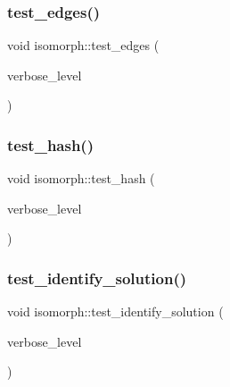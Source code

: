 \mbox{\label{classisomorph_ad23507927d8f7698073475d12b2a85bc}} 
\subsubsection{\texorpdfstring{test\+\_\+edges()}{test\_edges()}}
{\footnotesize\ttfamily void isomorph\+::test\+\_\+edges (\begin{DoxyParamCaption}\item[{\mbox{\hyperlink{galois_8h_a09fddde158a3a20bd2dcadb609de11dc}{I\+NT}}}]{verbose\+\_\+level }\end{DoxyParamCaption})}

\mbox{\label{classisomorph_a53560280664b268a0500d26c801b1e68}} 
\subsubsection{\texorpdfstring{test\+\_\+hash()}{test\_hash()}}
{\footnotesize\ttfamily void isomorph\+::test\+\_\+hash (\begin{DoxyParamCaption}\item[{\mbox{\hyperlink{galois_8h_a09fddde158a3a20bd2dcadb609de11dc}{I\+NT}}}]{verbose\+\_\+level }\end{DoxyParamCaption})}

\mbox{\label{classisomorph_aa2c95f309e3283179e87bbbd83bfdc7d}} 
\subsubsection{\texorpdfstring{test\+\_\+identify\+\_\+solution()}{test\_identify\_solution()}}
{\footnotesize\ttfamily void isomorph\+::test\+\_\+identify\+\_\+solution (\begin{DoxyParamCaption}\item[{\mbox{\hyperlink{galois_8h_a09fddde158a3a20bd2dcadb609de11dc}{I\+NT}}}]{verbose\+\_\+level }\end{DoxyParamCaption})}

